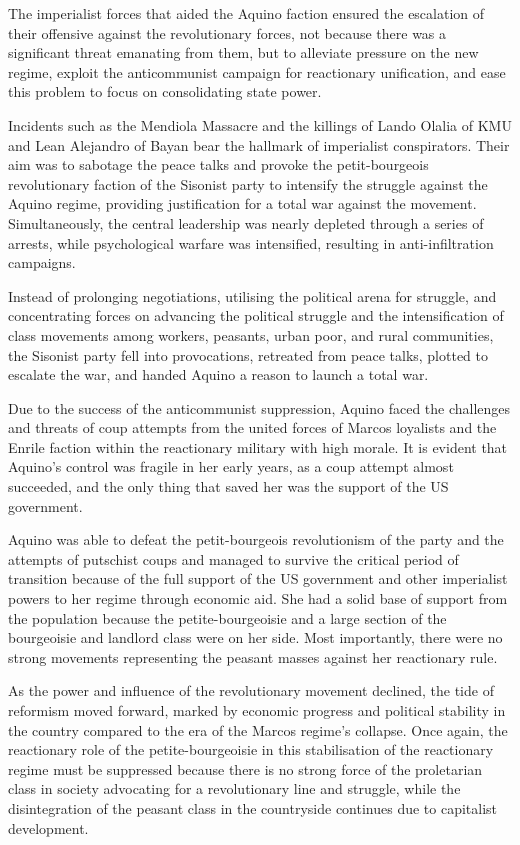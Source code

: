 The imperialist forces that aided the Aquino faction ensured 
the escalation of their offensive against the revolutionary forces, 
not because there was a significant threat emanating from them, 
but to alleviate pressure on the new regime, 
exploit the anticommunist campaign for reactionary unification, 
and ease this problem to focus on consolidating state power.

Incidents such as the Mendiola Massacre and the killings of Lando Olalia of KMU 
and Lean Alejandro of Bayan bear the hallmark of imperialist conspirators. 
Their aim was to sabotage the peace talks 
and provoke the petit-bourgeois revolutionary faction of the Sisonist party 
to intensify the struggle against the Aquino regime, 
providing justification for a total war against the movement. 
Simultaneously, the central leadership was nearly depleted 
through a series of arrests, while psychological warfare was intensified, 
resulting in anti-infiltration campaigns.

Instead of prolonging negotiations, utilising the political arena for struggle, 
and concentrating forces on advancing the political struggle 
and the intensification of class movements 
among workers, peasants, urban poor, and rural communities, 
the Sisonist party fell into provocations, retreated from peace talks, 
plotted to escalate the war, and handed Aquino a reason to launch a total war.

Due to the success of the anticommunist suppression, 
Aquino faced the challenges and threats of coup attempts 
from the united forces of Marcos loyalists 
and the Enrile faction within the reactionary military with high morale. 
It is evident that Aquino's control was fragile in her early years, 
as a coup attempt almost succeeded, 
and the only thing that saved 
her was the support of the US government.

Aquino was able to defeat the petit-bourgeois revolutionism of the party 
and the attempts of putschist coups 
and managed to survive the critical period of transition 
because of the full support of the US government 
and other imperialist powers to her regime through economic aid. 
She had a solid base of support from the population 
because the petite-bourgeoisie 
and a large section of the bourgeoisie 
and landlord class were on her side. 
Most importantly, 
there were no strong movements representing the peasant masses 
against her reactionary rule.

As the power and influence of the revolutionary movement declined, 
the tide of reformism moved forward, 
marked by economic progress and political stability in the country 
compared to the era of the Marcos regime's collapse. 
Once again, the reactionary role of the petite-bourgeoisie 
in this stabilisation of the reactionary regime 
must be suppressed 
because there is no strong force of the proletarian class 
in society advocating for a revolutionary line and struggle, 
while the disintegration of the peasant class 
in the countryside continues due to capitalist development.


